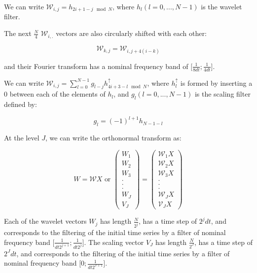 \documentclass[main.tex]{subfiles}
\begin{document}
We can write $\mathcal{W}_{i , j} = h_{2 i + 1 - j \mod N}$, where $h_l \left( l = 0 , ... , N - 1 \right)$ is the wavelet filter.

The next $\frac{N}{4}$ $\mathcal{W}_{i , .}$ vectors are also circularly shifted with each other:

\begin{equation}
\mathcal{W}_{k , j} = \mathcal{W}_{i , j + 4 \left( i - k \right)}
\end{equation}

and their Fourier transform has a nominal frequency band of $\lbrack \frac{1}{8 dt} ; \frac{1}{4 dt} \rbrack$.

We can write $\mathcal{W}_{i , j} = \sum_{l = 0}^{N - 1} g_{l - j} h_{4 i + 3 - l \mod N}^{\uparrow}$, where $h_l^{\uparrow}$ is formed by inserting a $0$ between each of the elements of $h_l$, and $g_l \left( l = 0 , ... , N - 1 \right)$ is the scaling filter defined by:

\begin{equation}
g_l = \left( - 1 \right) ^{l + 1} h_{N - 1 - l}
\end{equation}

At the level $J$, we can write the orthonormal transform as:

\begin{equation}
W = \mathcal{W} X \text{ or } \begin{pmatrix} W_1 \\ W_2 \\ W_3 \\ . \\ . \\ . \\ W_J \\ V_J \end{pmatrix}
= \begin{pmatrix} \mathcal{W}_1 X \\ \mathcal{W}_2 X \\ \mathcal{W}_3 X \\ . \\ . \\ . \\ \mathcal{W}_J X \\ \mathcal{V}_J X \end{pmatrix}
\end{equation}

Each of the wavelet vectors $W_j$ has length $\frac{N}{2^j}$, has a time step of $2^j dt$, and corresponds to the filtering of the initial time series by a filter of nominal frequency band $\lbrack \frac{1}{dt 2^{j + 1}} ; \frac{1}{dt 2^j} \rbrack$. The scaling vector $V_J$ has length $\frac{N}{2^J}$, has a time step of $2^J dt$, and corresponds to the filtering of the initial time series by a filter of nominal frequency band $\lbrack 0 ; \frac{1}{dt 2^{J + 1}} \rbrack$.
\end{document}
